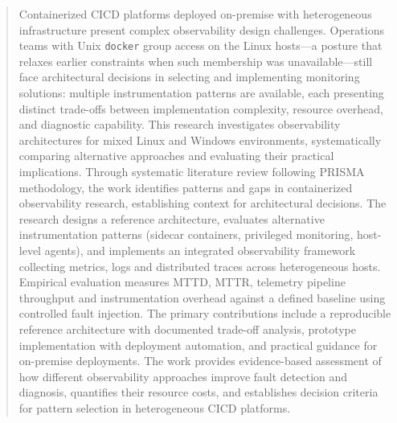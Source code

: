 \begin{abstract}

Containerized \ac{CICD} platforms deployed on-premise with heterogeneous infrastructure present complex observability design challenges. Operations teams with Unix \texttt{docker} group access on the Linux hosts---a posture that relaxes earlier constraints when such membership was unavailable---still face architectural decisions in selecting and implementing monitoring solutions: multiple instrumentation patterns are available, each presenting distinct trade-offs between implementation complexity, resource overhead, and diagnostic capability. This research investigates observability architectures for mixed Linux and Windows environments, systematically comparing alternative approaches and evaluating their practical implications. Through systematic literature review following \ac{PRISMA} methodology, the work identifies patterns and gaps in containerized observability research, establishing context for architectural decisions. The research designs a reference architecture, evaluates alternative instrumentation patterns (sidecar containers, privileged monitoring, host-level agents), and implements an integrated observability framework collecting metrics, logs and distributed traces across heterogeneous hosts. Empirical evaluation measures \ac{MTTD}, \ac{MTTR}, telemetry pipeline throughput and instrumentation overhead against a defined baseline using controlled fault injection. The primary contributions include a reproducible reference architecture with documented trade-off analysis, prototype implementation with deployment automation, and practical guidance for on-premise deployments. The work provides evidence-based assessment of how different observability approaches improve fault detection and diagnosis, quantifies their resource costs, and establishes decision criteria for pattern selection in heterogeneous \ac{CICD} platforms.
\end{abstract}


